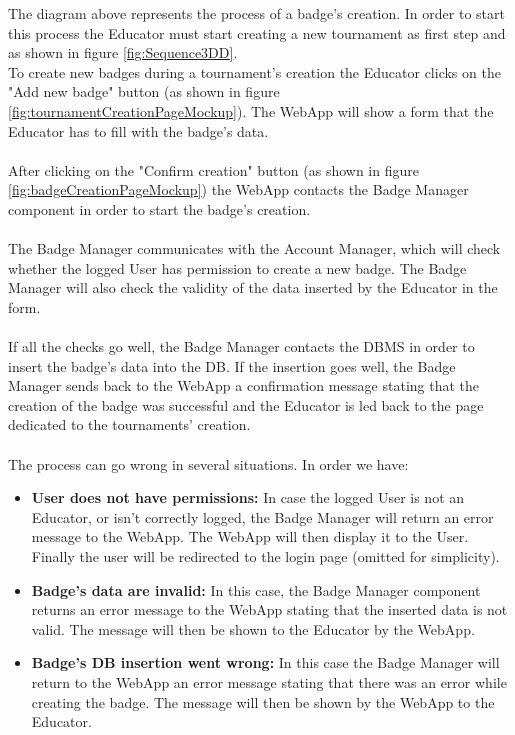 \documentclass{article}
\begin{document}
{        The diagram above represents the process of a badge's creation.
        In order to start this process the Educator must start creating a new tournament as first
        step and as shown in figure \ref{fig:Sequence3DD}. \\
        To create new badges during a tournament's creation the Educator clicks on the 
        "Add new badge" button (as shown in figure \ref{fig:tournamentCreationPageMockup}). 
        The WebApp will show a form that the Educator has to fill with the badge's data. 
        \\ \\
        After clicking on the "Confirm creation" button (as shown in figure \ref{fig:badgeCreationPageMockup})
        the WebApp contacts the Badge Manager component in order to start the badge's creation.
        \\ \\
        The Badge Manager communicates with the Account Manager, which will check whether the 
        logged User has permission to create a new badge. The Badge Manager will also
        check the validity of the data inserted by the Educator in the form.
        \\ \\
        If all the checks go well, the Badge Manager contacts the DBMS in order to insert the
        badge's data into the DB.
        If the insertion goes well, the Badge Manager sends back to the WebApp a confirmation
        message stating that the creation of the badge was successful and the Educator is led back
        to the page dedicated to the tournaments' creation.
        \\ \\
        The process can go wrong in several situations. In order we have:
        \begin{itemize}
            \item \textbf{User does not have permissions:} In case the logged User is not an
            Educator, or isn't correctly logged, the Badge Manager will return an
            error message to the WebApp. The WebApp will then display it to the User.
            Finally the user will be redirected to the login page (omitted for simplicity).
            \item \textbf{Badge's data are invalid:} In this case, the Badge Manager component 
            returns an error message to the WebApp stating that the inserted data is not 
            valid. The message will then be shown to the Educator by the WebApp.
            \item \textbf{Badge's DB insertion went wrong:} In this case the Badge Manager will 
            return to the WebApp an error message stating that there was an error while creating 
            the badge. The message will then be shown by the WebApp to the Educator.
        \end{itemize}

}
\end{document}

